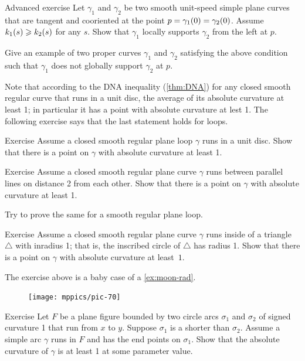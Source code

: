 \begin{thm}{Advanced exercise}\label{ex:support}
Let $\gamma_1$ and $\gamma_2$ be two smooth unit-speed simple plane curves that are tangent and cooriented at the point $p\z=\gamma_1(0)=\gamma_2(0)$.
Assume $k_1(s)\geqslant k_2(s)$ for any $s$.
Show that $\gamma_1$ locally supports $\gamma_2$ from the left at $p$.

Give an example of two proper curves $\gamma_1$ and $\gamma_2$ satisfying the above condition such that $\gamma_1$ does not globally support $\gamma_2$ at $p$.
\end{thm}

Note that according to the DNA inequality (\ref{thm:DNA}) for any closed smooth regular curve that runs in a unit disc, the average of its absolute curvature at least 1; in particular it has a point with absolute curvature at lest 1.
The following exercise says that the last statement holds for loops.

\begin{thm}{Exercise}\label{ex:between-parallels-1}
Assume a closed smooth regular plane loop $\gamma$ runs in a unit disc.
Show that there is a point on $\gamma$ with absolute curvature at least 1.
\end{thm}


\begin{thm}{Exercise}\label{ex:between-parallels-1}
Assume a closed smooth regular plane curve $\gamma$ runs between parallel lines on distance 2 from each other.
Show that there is a point on $\gamma$ with absolute curvature at least 1.

Try to prove the same for a smooth regular plane loop.
\end{thm}

\begin{thm}{Exercise}\label{ex:in-triangle}
Assume a closed smooth regular plane curve $\gamma$ runs inside of a triangle $\triangle$ with inradius 1; that is, the inscribed circle of $\triangle$ has radius 1.
Show that there is a point on $\gamma$ with absolute curvature at least~$1$.
\end{thm}

The exercise above is a baby case of a \ref{ex:moon-rad}.

{

\begin{figure}
\vskip-4mm
\centering
\texttt{[image: mppics/pic-70]}
\vskip0mm
\end{figure}

\begin{thm}{Exercise}
Let $F$ be a plane figure bounded by two circle arcs $\sigma_1$ and $\sigma_2$ of signed curvature 1 that run from $x$ to $y$.
Suppose $\sigma_1$ is a shorter than $\sigma_2$.
Assume a simple arc $\gamma$ runs in $F$ and has the end points on $\sigma_1$.
Show that the absolute curvature of $\gamma$ is at least 1 at some parameter value.

\end{thm}

}

